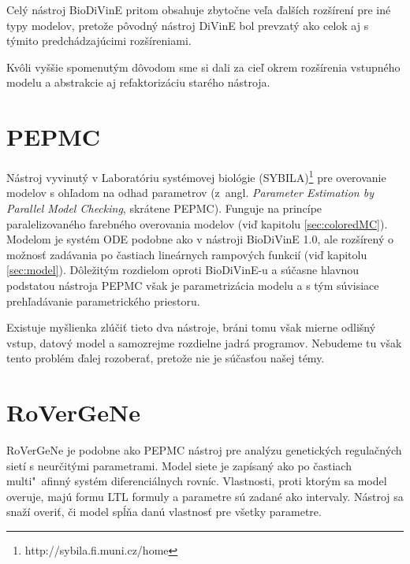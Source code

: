 \documentclass[11pt,final,oneside]{fithesis}
\begin{document}
Cel\'y n\'astroj BioDiVinE pritom obsahuje zbyto\v cne ve\v la \v dal\v s\'ich roz\v s\'iren\'i pre in\'e typy modelov, preto\v ze p\^ ovodn\'y n\'astroj 
DiVinE bol prevzat\'y ako celok aj s t\'ymito predch\'adzaj\'ucimi roz\v s\'ireniami.

Kv\^ oli vy\v s\v sie spomenut\'ym d\^ ovodom sme si dali za cie\v l okrem roz\v s\'irenia vstupn\'eho modelu a abstrakcie aj refaktoriz\'aciu star\'eho n\'astroja.
\cite{BIODIVINE}

\section{PEPMC}
\label{sec:pepmc}
N\'astroj vyvinut\'y v Laborat\'oriu syst\'emovej biol\'ogie (SYBILA)\footnote{http://sybila.fi.muni.cz/home} pre overovanie modelov s oh\v ladom na odhad 
parametrov (z~angl. \textit{
Parameter Estimation by Parallel Model Checking}, skr\'atene PEPMC). Funguje na princ\'ipe paralelizovan\'eho farebn\'eho overovania modelov 
(vi\v d kapitolu \ref{sec:coloredMC}). Modelom je syst\'em ODE podobne ako v n\'astroji BioDiVinE 1.0, ale roz\v s\'iren\'y o mo\v znos\v t
zad\'avania po \v castiach line\'arnych rampov\'ych funkci\'i (vi\v d kapitolu \ref{sec:model}). D\^ ole\v zit\'ym rozdielom oproti BioDiVinE-u a s\'u\v casne 
hlavnou podstatou n\'astroja PEPMC v\v sak je parametriz\'acia modelu a s t\'ym s\'uvisiace preh\v lad\'avanie parametrick\'eho priestoru.

Existuje my\v slienka zl\'u\v ci\v t tieto dva n\'astroje, br\'ani tomu v\v sak mierne odli\v sn\'y vstup, datov\'y model a samozrejme rozdielne jadr\'a 
programov. Nebudeme tu v\v sak tento probl\'em \v dalej rozobera\v t, preto\v ze nie je s\'u\v cas\v tou na\v sej t\'emy.
\cite{HIBI-2010}

\section{RoVerGeNe}
RoVerGeNe je podobne ako PEPMC n\'astroj pre anal\'yzu genetick\'ych regula\v cn\'ych siet\'i s neur\v cit\'ymi parametrami. Model siete je zap\'isan\'y ako
po \v castiach multi"~afinn\'y syst\'em diferenci\'alnych rovn\'ic. Vlastnosti, proti ktor\'ym sa model overuje, maj\'u formu LTL formuly a parametre s\'u 
zadan\'e ako intervaly. N\'astroj sa sna\v z\'i overi\v t, \v ci model sp\'l\v na dan\'u vlastnos\v t pre v\v setky parametre.
\end{document}
